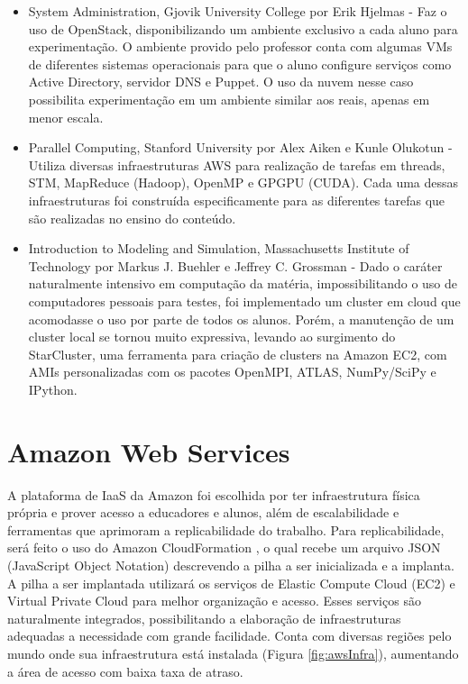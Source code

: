 \documentclass[tg]{mdtufsm}
\begin{document}
\begin{itemize}
\item System Administration, Gjovik University College por Erik Hjelmas \cite{erik} - Faz o uso de OpenStack, disponibilizando um ambiente exclusivo a cada aluno para experimentação. O ambiente provido pelo professor conta com algumas VMs de diferentes sistemas operacionais para que o aluno configure serviços como Active Directory, servidor DNS e Puppet. O uso da nuvem nesse caso possibilita experimentação em um ambiente similar aos reais, apenas em menor escala.

\item Parallel Computing, Stanford University por Alex Aiken e Kunle Olukotun \cite{stanford} - Utiliza diversas infraestruturas AWS para realização de tarefas em threads, STM, MapReduce (Hadoop), OpenMP e GPGPU (CUDA). Cada uma dessas infraestruturas foi construída especificamente para as diferentes tarefas que são realizadas no ensino do conteúdo.

\item Introduction to Modeling and Simulation, Massachusetts Institute of Technology por Markus J. Buehler e Jeffrey C. Grossman  \cite{starclusterMIT} - Dado o caráter naturalmente intensivo em computação da matéria, impossibilitando o uso de computadores pessoais para testes, foi implementado um cluster em cloud que acomodasse o uso por parte de todos os alunos. Porém, a manutenção de um cluster local se tornou muito expressiva, levando ao surgimento do StarCluster, uma ferramenta para criação de clusters na Amazon EC2, com AMIs personalizadas com os pacotes OpenMPI, ATLAS, NumPy/SciPy e IPython.
\end{itemize}

\section{Amazon Web Services}

A plataforma de IaaS da Amazon foi escolhida por ter infraestrutura física própria e prover acesso a educadores e alunos, além de escalabilidade e ferramentas que aprimoram a replicabilidade do trabalho. Para replicabilidade, será feito o uso do Amazon CloudFormation \cite{awscf}, o qual recebe um arquivo JSON (JavaScript Object Notation) descrevendo a pilha a ser inicializada e a implanta. A pilha a ser implantada utilizará os serviços de Elastic Compute Cloud (EC2)\cite{awsec2} e Virtual Private Cloud\cite{vpc} para melhor organização e acesso. Esses serviços são naturalmente integrados, possibilitando a elaboração de infraestruturas adequadas a necessidade com grande facilidade. Conta com diversas regiões pelo mundo onde sua infraestrutura está instalada (Figura \ref{fig:awsInfra}), aumentando a área de acesso com baixa taxa de atraso.
\end{document}
